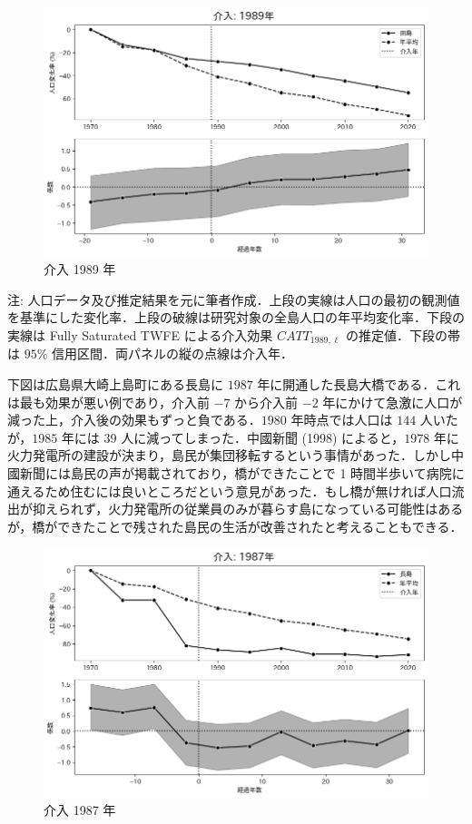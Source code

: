 \begin{figure}
\centering
\includegraphics{../figures/fully_saturated_twfe/1989.png}
\caption{介入 1989 年}
\end{figure}

注:
人口データ及び推定結果を元に筆者作成．上段の実線は人口の最初の観測値を基準にした変化率．上段の破線は研究対象の全島人口の年平均変化率．下段の実線は
Fully Saturated TWFE による介入効果 \(CATT_{1989, \ell}\)
の推定値．下段の帯は \(95\%\) 信用区間．両パネルの縦の点線は介入年．

下図は広島県大崎上島町にある長島に \(1987\)
年に開通した長島大橋である．これは最も効果が悪い例であり，介入前 \(-7\)
から介入前 \(-2\)
年にかけて急激に人口が減った上，介入後の効果もずっと負である．\(1980\)
年時点では人口は \(144\) 人いたが，\(1985\) 年には \(39\)
人に減ってしまった．中國新聞 (1998) によると，\(1978\)
年に火力発電所の建設が決まり，島民が集団移転するという事情があった．しかし中國新聞には島民の声が掲載されており，橋ができたことで
1
時間半歩いて病院に通えるため住むには良いところだという意見があった．もし橋が無ければ人口流出が抑えられず，火力発電所の従業員のみが暮らす島になっている可能性はあるが，橋ができたことで残された島民の生活が改善されたと考えることもできる．

\begin{figure}
\centering
\includegraphics{../figures/fully_saturated_twfe/1987.png}
\caption{介入 1987 年}
\end{figure}

